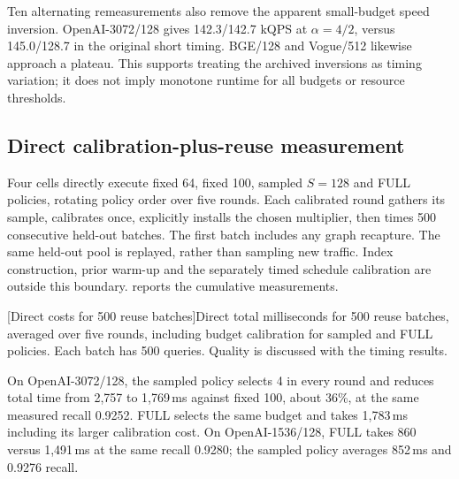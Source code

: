 Ten alternating remeasurements also remove the apparent small-budget
speed inversion. OpenAI-3072/128 gives 142.3/142.7 kQPS at
$\alpha=4/2$, versus 145.0/128.7 in the original short timing. BGE/128
and Vogue/512 likewise approach a plateau. This supports treating the
archived inversions as timing variation; it does not imply monotone
runtime for all budgets or resource thresholds.

\subsection{Direct calibration-plus-reuse measurement}
\label{sec:7-stream-cost}

Four cells directly execute fixed 64, fixed 100, sampled $S=128$ and
FULL policies, rotating policy order over five rounds. Each calibrated
round gathers its sample, calibrates once, explicitly installs the chosen
multiplier, then times 500 consecutive held-out batches. The first batch
includes any graph recapture. The same held-out pool is replayed, rather
than sampling new traffic. Index construction, prior warm-up and the
separately timed schedule calibration are outside this boundary.
 reports the cumulative measurements.

\par\medskip\noindent\begin{minipage}{\linewidth}
\centering\captionsetup{hypcap=false}
[Direct costs for 500 reuse batches]{Direct total milliseconds for 500 reuse batches, averaged over
five rounds, including budget calibration for sampled and FULL policies.
Each batch has 500 queries. Quality is discussed with the timing results.}
\label{tab:7-stream-cost}
\footnotesize\setlength{\tabcolsep}{4pt}

\end{minipage}\par\medskip

On OpenAI-3072/128, the sampled policy selects 4 in every round and
reduces total time from 2,757 to 1,769\,ms against fixed 100, about
36\%, at the same measured recall 0.9252. FULL selects the same budget
and takes 1,783\,ms including its larger calibration cost. On
OpenAI-1536/128, FULL takes 860 versus 1,491\,ms at the same recall
0.9280; the sampled policy averages 852\,ms and 0.9276 recall.


